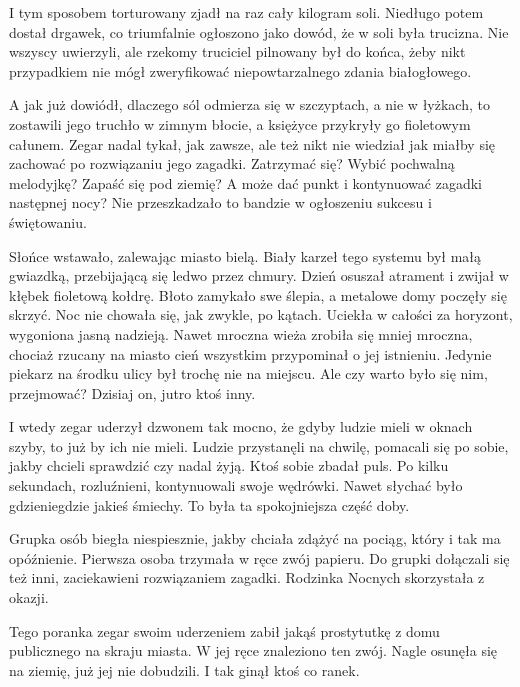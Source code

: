 I tym sposobem torturowany zjadł na raz cały kilogram soli.
Niedługo potem dostał drgawek, co triumfalnie ogłoszono jako dowód, że w soli była trucizna.
Nie wszyscy uwierzyli, ale rzekomy truciciel pilnowany był do końca, żeby nikt przypadkiem nie mógł zweryfikować niepowtarzalnego zdania białogłowego.

A jak już dowiódł, dlaczego sól odmierza się w szczyptach, a nie w łyżkach, to zostawili jego truchło w zimnym błocie, a księżyce przykryły go fioletowym całunem.
Zegar nadal tykał, jak zawsze, ale też nikt nie wiedział jak miałby się zachować po rozwiązaniu jego zagadki.
Zatrzymać się? Wybić pochwalną melodyjkę? Zapaść się pod ziemię? A może dać punkt i kontynuować zagadki następnej nocy?
Nie przeszkadzało to bandzie w ogłoszeniu sukcesu i świętowaniu.

Słońce wstawało, zalewając miasto bielą.
Biały karzeł tego systemu był małą gwiazdką, przebijającą się ledwo przez chmury.
Dzień osuszał atrament i zwijał w kłębek fioletową kołdrę.
Błoto zamykało swe ślepia, a metalowe domy poczęły się skrzyć.
Noc nie chowała się, jak zwykle, po kątach. Uciekła w całości za horyzont, wygoniona jasną nadzieją.
Nawet mroczna wieża zrobiła się mniej mroczna, chociaż rzucany na miasto cień wszystkim przypominał o jej istnieniu.
Jedynie piekarz na środku ulicy był trochę nie na miejscu.
Ale czy warto było się nim, przejmować? 
Dzisiaj on, jutro ktoś inny.

I wtedy zegar uderzył dzwonem tak mocno, że gdyby ludzie mieli w oknach szyby, to już by ich nie mieli.
Ludzie przystanęli na chwilę, pomacali się po sobie, jakby chcieli sprawdzić czy nadal żyją.
Ktoś sobie zbadał puls.
Po kilku sekundach, rozluźnieni, kontynuowali swoje wędrówki.
Nawet słychać było gdzieniegdzie jakieś śmiechy.
To była ta spokojniejsza część doby.

Grupka osób biegła niespiesznie, jakby chciała zdążyć na pociąg, który i tak ma opóźnienie.
Pierwsza osoba trzymała w ręce zwój papieru.
Do grupki dołączali się też inni, zaciekawieni rozwiązaniem zagadki.
Rodzinka Nocnych skorzystała z okazji.

Tego poranka zegar swoim uderzeniem zabił jakąś prostytutkę z domu publicznego na skraju miasta.
W jej ręce znaleziono ten zwój.
Nagle osunęła się na ziemię, już jej nie dobudzili.
I tak ginął ktoś co ranek.

